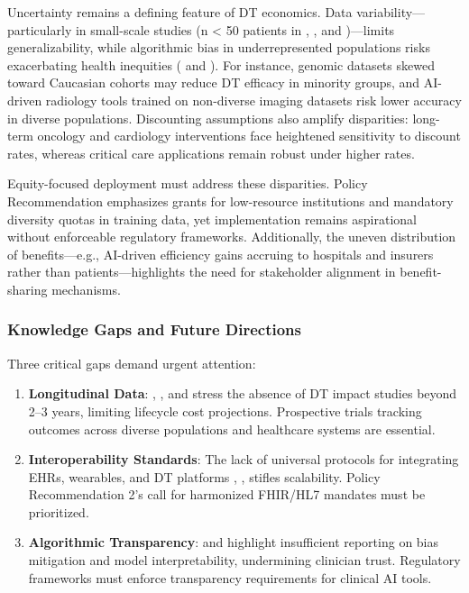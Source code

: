 \documentclass[10pt,a4paper]{article}
\begin{document}
Uncertainty remains a defining feature of DT economics. Data variability—particularly in small-scale studies (n < 50 patients in  \cite{Mascret2024}, \cite{Wang2025}, and \cite{Bocean2025})—limits generalizability, while algorithmic bias in underrepresented populations risks exacerbating health inequities ( \cite{Wang2025} and \cite{Bocean2025}). For instance, genomic datasets skewed toward Caucasian cohorts may reduce DT efficacy in minority groups, and AI-driven radiology tools trained on non-diverse imaging datasets risk lower accuracy in diverse populations. Discounting assumptions also amplify disparities: long-term oncology and cardiology interventions face heightened sensitivity to discount rates, whereas critical care applications remain robust under higher rates.

Equity-focused deployment must address these disparities. Policy Recommendation \cite{Ahmed2023} emphasizes grants for low-resource institutions and mandatory diversity quotas in training data, yet implementation remains aspirational without enforceable regulatory frameworks. Additionally, the uneven distribution of benefits—e.g., AI-driven efficiency gains accruing to hospitals and insurers rather than patients—highlights the need for stakeholder alignment in benefit-sharing mechanisms.

\subsubsection*{Knowledge Gaps and Future Directions}
Three critical gaps demand urgent attention:
\begin{enumerate}

    \item 	\textbf{Longitudinal Data}:  \cite{Mascret2024}, \cite{Wang2025}, and \cite{Bocean2025} stress the absence of DT impact studies beyond 2–3 years, limiting lifecycle cost projections. Prospective trials tracking outcomes across diverse populations and healthcare systems are essential.
    \item	\textbf{Interoperability Standards}: The lack of universal protocols for integrating EHRs, wearables, and DT platforms \cite{Mascret2024}, \cite{Ahmed2023}, \cite{Bocean2025} stifles scalability. Policy Recommendation 2’s call for harmonized FHIR/HL7 mandates must be prioritized.
    \item	\textbf{Algorithmic Transparency}:  \cite{Wang2025} and \cite{Bocean2025} highlight insufficient reporting on bias mitigation and model interpretability, undermining clinician trust. Regulatory frameworks must enforce transparency requirements for clinical AI tools.
\end{enumerate}
\end{document}
